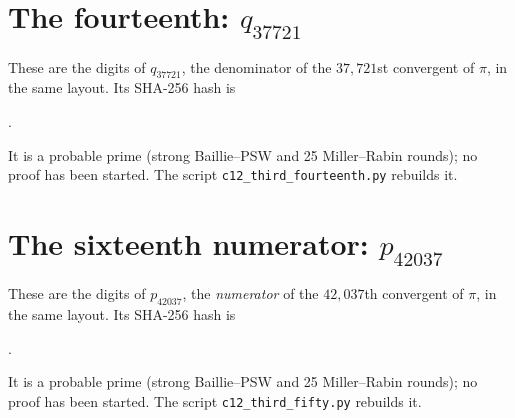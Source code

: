 

\section*{The fourteenth: $q_{37721}$}

These are the \FoDigits{} digits of $q_{37721}$, the denominator of the $37{,}721$st convergent of $\pi$, in the same layout. Its SHA-256 hash is
\begin{center}\texttt{\FoSha}.\end{center}
\noindent It is a probable prime (strong Baillie--PSW and 25 Miller--Rabin rounds); no proof has been started. The script \texttt{c12\_third\_fourteenth.py} rebuilds it.



\section*{The sixteenth numerator: $p_{42037}$}

These are the \FiDigits{} digits of $p_{42037}$, the \emph{numerator} of the $42{,}037$th convergent of $\pi$, in the same layout. Its SHA-256 hash is
\begin{center}\texttt{\FiSha}.\end{center}
\noindent It is a probable prime (strong Baillie--PSW and 25 Miller--Rabin rounds); no proof has been started. The script \texttt{c12\_third\_fifty.py} rebuilds it.



